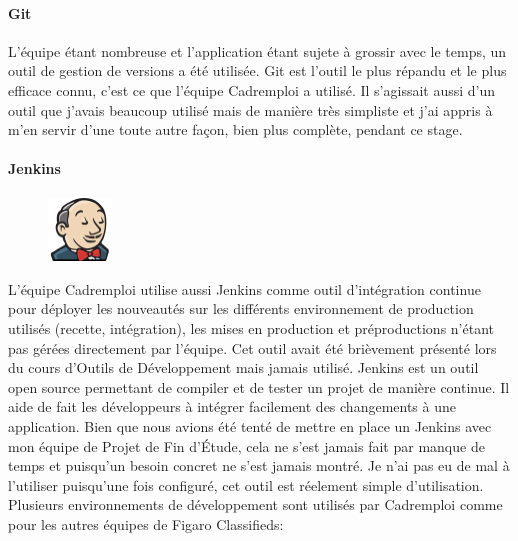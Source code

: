 \paragraph{Git}
\label{par:Git}
L'équipe étant nombreuse et l'application étant sujete à grossir avec le temps, un outil de gestion de versions a été utilisée.
Git est l'outil le plus répandu et le plus efficace connu, c'est ce que l'équipe Cadremploi a utilisé.
Il s'agissait aussi d'un outil que j'avais beaucoup utilisé mais de manière très simpliste et j'ai appris à m'en servir d'une toute autre façon, bien plus complète, pendant ce stage.
\paragraph{Jenkins}
\label{par:Jenkins}
\begin{figure}
  \begin{center}
    \includegraphics[width=0.15\textwidth]{Pictures/jenkins_logo.png}
  \end{center}
\end{figure}
L'équipe Cadremploi utilise aussi Jenkins comme outil d'intégration continue pour déployer les nouveautés sur les différents environnement de production utilisés (recette, intégration), les mises en production et préproductions n'étant pas gérées directement par l'équipe.
Cet outil avait été brièvement présenté lors du cours d'Outils de Développement mais jamais utilisé.
Jenkins est un outil open source permettant de compiler et de tester un projet de manière continue.
Il aide de fait les développeurs à intégrer facilement des changements à une application.
Bien que nous avions été tenté de mettre en place un Jenkins avec mon équipe de Projet de Fin d'Étude, cela ne s'est jamais fait par manque de temps et puisqu'un besoin concret ne s'est jamais montré.
Je n'ai pas eu de mal à l'utiliser puisqu'une fois configuré, cet outil est réelement simple d'utilisation.
Plusieurs environnements de développement sont utilisés par Cadremploi comme pour les autres équipes de Figaro Classifieds:
